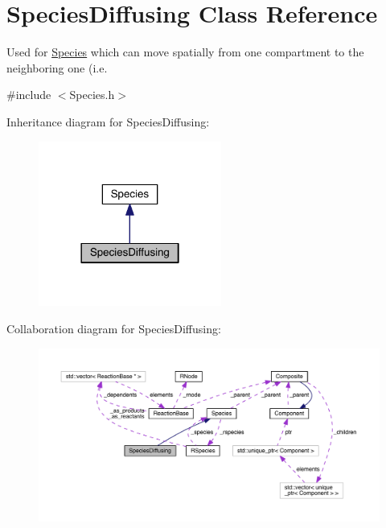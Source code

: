 \hypertarget{classSpeciesDiffusing}{\section{Species\+Diffusing Class Reference}
\label{classSpeciesDiffusing}
}


Used for \hyperlink{classSpecies}{Species} which can move spatially from one compartment to the neighboring one (i.\+e.  




{\ttfamily \#include $<$Species.\+h$>$}



Inheritance diagram for Species\+Diffusing\+:\nopagebreak
\begin{figure}[H]
\begin{center}
\leavevmode
\includegraphics[width=170pt]{classSpeciesDiffusing__inherit__graph}
\end{center}
\end{figure}


Collaboration diagram for Species\+Diffusing\+:\nopagebreak
\begin{figure}[H]
\begin{center}
\leavevmode
\includegraphics[width=350pt]{classSpeciesDiffusing__coll__graph}
\end{center}
\end{figure}
